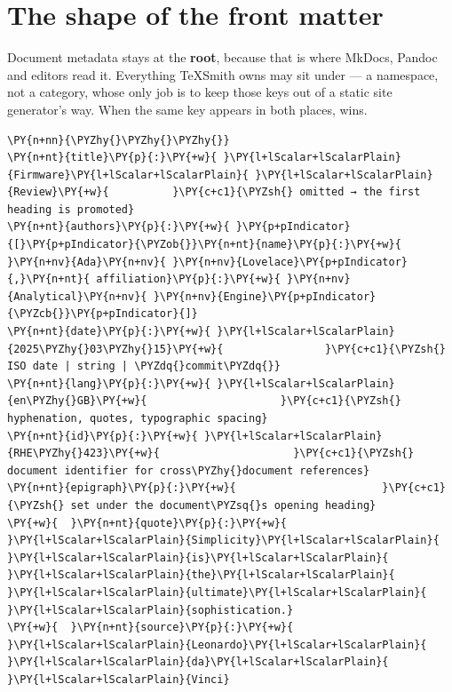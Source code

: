 \documentclass[a4paper,twoside]{article}
\begin{document}
\section{The shape of the front matter}
Document metadata stays at the \textbf{root}, because that is where MkDocs, Pandoc
and editors read it. Everything TeXSmith owns may sit under  --- a
namespace, not a category, whose only job is to keep those keys out of a static
site generator's way. When the same key appears in both places,  wins.
\begin{tscode}[lang=yaml, engine=pygments]
\begin{Verbatim}[commandchars=\\\{\},breaklines, breakanywhere, commandchars=\\\{\}]
\PY{n+nn}{\PYZhy{}\PYZhy{}\PYZhy{}}
\PY{n+nt}{title}\PY{p}{:}\PY{+w}{ }\PY{l+lScalar+lScalarPlain}{Firmware}\PY{l+lScalar+lScalarPlain}{ }\PY{l+lScalar+lScalarPlain}{Review}\PY{+w}{          }\PY{c+c1}{\PYZsh{} omitted → the first heading is promoted}
\PY{n+nt}{authors}\PY{p}{:}\PY{+w}{ }\PY{p+pIndicator}{[}\PY{p+pIndicator}{\PYZob{}}\PY{n+nt}{name}\PY{p}{:}\PY{+w}{ }\PY{n+nv}{Ada}\PY{n+nv}{ }\PY{n+nv}{Lovelace}\PY{p+pIndicator}{,}\PY{n+nt}{ affiliation}\PY{p}{:}\PY{+w}{ }\PY{n+nv}{Analytical}\PY{n+nv}{ }\PY{n+nv}{Engine}\PY{p+pIndicator}{\PYZcb{}}\PY{p+pIndicator}{]}
\PY{n+nt}{date}\PY{p}{:}\PY{+w}{ }\PY{l+lScalar+lScalarPlain}{2025\PYZhy{}03\PYZhy{}15}\PY{+w}{                }\PY{c+c1}{\PYZsh{} ISO date | string | \PYZdq{}commit\PYZdq{}}
\PY{n+nt}{lang}\PY{p}{:}\PY{+w}{ }\PY{l+lScalar+lScalarPlain}{en\PYZhy{}GB}\PY{+w}{                     }\PY{c+c1}{\PYZsh{} hyphenation, quotes, typographic spacing}
\PY{n+nt}{id}\PY{p}{:}\PY{+w}{ }\PY{l+lScalar+lScalarPlain}{RHE\PYZhy{}423}\PY{+w}{                     }\PY{c+c1}{\PYZsh{} document identifier for cross\PYZhy{}document references}
\PY{n+nt}{epigraph}\PY{p}{:}\PY{+w}{                       }\PY{c+c1}{\PYZsh{} set under the document\PYZsq{}s opening heading}
\PY{+w}{  }\PY{n+nt}{quote}\PY{p}{:}\PY{+w}{ }\PY{l+lScalar+lScalarPlain}{Simplicity}\PY{l+lScalar+lScalarPlain}{ }\PY{l+lScalar+lScalarPlain}{is}\PY{l+lScalar+lScalarPlain}{ }\PY{l+lScalar+lScalarPlain}{the}\PY{l+lScalar+lScalarPlain}{ }\PY{l+lScalar+lScalarPlain}{ultimate}\PY{l+lScalar+lScalarPlain}{ }\PY{l+lScalar+lScalarPlain}{sophistication.}
\PY{+w}{  }\PY{n+nt}{source}\PY{p}{:}\PY{+w}{ }\PY{l+lScalar+lScalarPlain}{Leonardo}\PY{l+lScalar+lScalarPlain}{ }\PY{l+lScalar+lScalarPlain}{da}\PY{l+lScalar+lScalarPlain}{ }\PY{l+lScalar+lScalarPlain}{Vinci}


\end{Verbatim}
\end{tscode}
\end{document}
